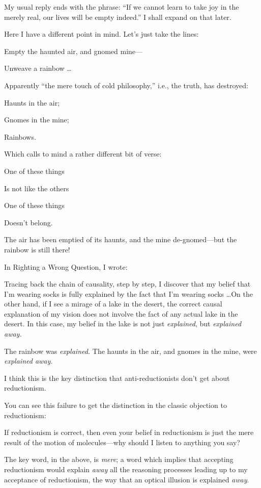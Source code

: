 {
 My usual reply ends with the phrase: ``If we
cannot learn to take joy in the merely real, our lives will be empty
indeed.'' I shall expand on that later.}

{
 Here I have a different point in mind. Let's just
take the lines:}

{
 Empty the haunted air, and gnomed mine---}

{
 Unweave a rainbow \ldots}

{
 Apparently ``the mere touch of cold
philosophy,'' i.e., the truth, has destroyed:}

{
 Haunts in the air;}

{
 Gnomes in the mine;}

{
 Rainbows.}

{
 Which calls to mind a rather different bit of verse:}

{
 One of these things}

{
 Is not like the others}

{
 One of these things}

{
 Doesn't belong.}

{
 The air has been emptied of its haunts, and the mine
de-gnomed---but the rainbow is still there!}

{
 In Righting a Wrong Question, I wrote:}

{
 Tracing back the chain of causality, step by step, I discover that
my belief that I'm wearing socks is fully explained by
the fact that I'm wearing socks \ldots On the other
hand, if I see a mirage of a lake in the desert, the correct causal
explanation of my vision does not involve the fact of any actual lake
in the desert. In this case, my belief in the lake is not just
\textit{explained}, but \textit{explained away.}}

{
 The rainbow was \textit{explained.} The haunts in the air, and
gnomes in the mine, were \textit{explained away.}}

{
 I think this is the key distinction that anti-reductionists
don't get about reductionism.}

{
 You can see this failure to get the distinction in the classic
objection to reductionism:}

{
 If reductionism is correct, then even your belief in reductionism
is just the mere result of the motion of molecules---why should I
listen to anything you say?}

{
 The key word, in the above, is \textit{mere}; a word which implies
that accepting reductionism would explain \textit{away} all the
reasoning processes leading up to my acceptance of reductionism, the
way that an optical illusion is explained \textit{away}.}

